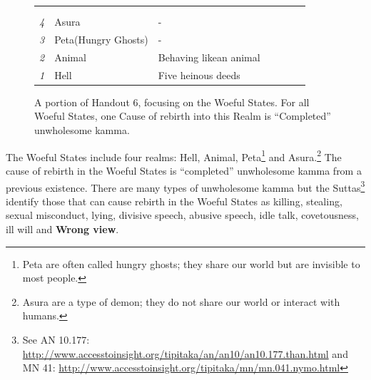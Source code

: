 \begin{figure}[H]
\centering
\setlength{\tabcolsep}{0mm}
\noindent\begin{tabular}{L{0.05\textwidth} C{0.2\textwidth} C{0.22\textwidth} C{0.15\textwidth} C{0.2\textwidth} C{0.09\textwidth} C{0.09\textwidth}}
\toprule
 & 
 & 
 & 
 & 
 & 
 \\
 & & & & &  & 
 \\
\midrule
\textit{4}
& Asura
& -
& 
& 
& 
& 
\\[6mm]
\textit{3} & Peta\newline (Hungry Ghosts) & - & & & &
\\[6mm]
\textit{2} & Animal & Behaving like\newline an animal & & & &
\\[6mm]
\textit{1} & Hell & Five heinous deeds & & & &
\\[6mm]
\bottomrule
\end{tabular}

\caption{A portion of Handout 6, focusing on the Woeful States. For all Woeful States, one Cause of rebirth into this Realm is ``Completed'' unwholesome kamma.}
\label{fig:Woeful1}
\end{figure}

The Woeful States include four realms: Hell, Animal, Peta\footnote{Peta are often called hungry ghosts; they share our world but are invisible to most people.} and Asura.\footnote{Asura are a type of demon; they do not share our world or interact with humans.} The cause of rebirth in the Woeful States is “completed” unwholesome kamma from a previous existence. There are many types of unwholesome kamma but the Suttas\footnote{See AN 10.177: \url{http://www.accesstoinsight.org/tipitaka/an/an10/an10.177.than.html} and MN 41: \url{http://www.accesstoinsight.org/tipitaka/mn/mn.041.nymo.html}} identify those that can cause rebirth in the Woeful States as killing, stealing, sexual misconduct, lying, divisive speech, abusive speech, idle talk, covetousness, ill will and \textbf{Wrong view}.

